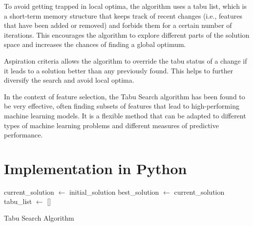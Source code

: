 \documentclass[conference]{IEEEtran}
\begin{document}
To avoid getting trapped in local optima, the algorithm uses a tabu list, which is a short-term memory structure that keeps track of recent changes (i.e., features that have been added or removed) and forbids them for a certain number of iterations. This encourages the algorithm to explore different parts of the solution space and increases the chances of finding a global optimum.

Aspiration criteria allows the algorithm to override the tabu status of a change if it leads to a solution better than any previously found. This helps to further diversify the search and avoid local optima.

In the context of feature selection, the Tabu Search algorithm has been found to be very effective, often finding subsets of features that lead to high-performing machine learning models. It is a flexible method that can be adapted to different types of machine learning problems and different measures of predictive performance.

\section{Implementation in Python}

\begin{algorithm}[!t]
\SetAlgoLined
{}

current\_solution $\leftarrow$ initial\_solution\;
best\_solution $\leftarrow$ current\_solution\;
tabu\_list $\leftarrow$ []\;

\caption{Tabu Search Algorithm}
\end{algorithm}
\end{document}
